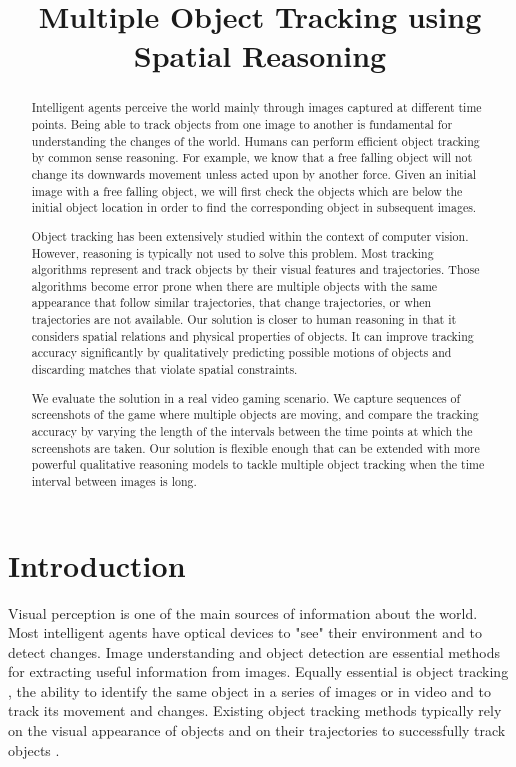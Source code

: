 \documentclass[letterpaper]{article}
\title{Multiple Object Tracking using Spatial Reasoning}
\begin{document}
\maketitle    
\begin{abstract}
Intelligent agents perceive the world mainly through images captured at  different time points. Being able to track objects from one image to another is fundamental for understanding the changes of the world. 
Humans can perform efficient object tracking by common sense reasoning. For example, we know that a free falling object will not change its downwards movement unless acted upon by another force. Given an initial image with a free falling object, we will first check the objects which are below the initial object location in order to find the corresponding object in subsequent images. 

Object tracking has been extensively studied within the context of computer vision. However, reasoning is typically not used to solve this problem. Most tracking algorithms represent and track objects by their visual features and trajectories. Those algorithms become error prone when there are multiple objects with the same appearance that follow similar trajectories, that change trajectories, or when trajectories are not available. Our solution is closer to human reasoning in that it considers spatial relations and physical properties of objects. It can improve tracking accuracy significantly by qualitatively predicting possible motions of objects and discarding matches that violate spatial constraints. 

We evaluate the solution in a real video gaming scenario. We capture sequences of screenshots of the game where multiple objects are moving, and compare the tracking accuracy by varying the length of the intervals between the time points at which the screenshots are taken. Our solution is flexible enough that can be extended with more powerful qualitative reasoning models to tackle multiple object tracking when the time interval between images is long. 
\end{abstract}
\section{Introduction}

Visual perception is one of the main sources of information about the world. Most intelligent agents have optical devices to "see" their environment and to detect changes. Image understanding \cite{sonka1999image,sridhar2011video} and object detection \cite{papageorgiou1998general} are essential methods for extracting useful information from images. Equally essential is object tracking \cite{yilmaz2006object}, the ability to identify the same object in a series of images or in video and to track its movement and changes. Existing object tracking methods typically rely on the visual appearance of objects and on their trajectories to successfully track objects \cite{yilmaz2004contour,cutler2000robust,viola2005detecting}.
\end{document}
